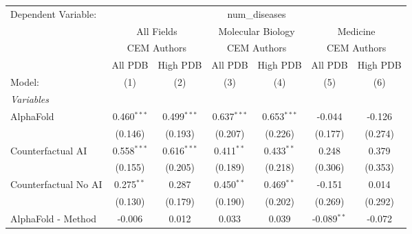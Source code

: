 \begingroup
\centering
\begin{tabular}{lcccccc}
   \tabularnewline \midrule \midrule
   Dependent Variable: & \multicolumn{6}{c}{num\_diseases}\\
 & \multicolumn{2}{c}{All Fields} & \multicolumn{2}{c}{Molecular Biology} & \multicolumn{2}{c}{Medicine} \\
\cmidrule(lr){2-3} \cmidrule(lr){4-5} \cmidrule(lr){6-7}
 & \multicolumn{2}{c}{CEM Authors} & \multicolumn{2}{c}{CEM Authors} & \multicolumn{2}{c}{CEM Authors} \\
\cmidrule(lr){2-3} \cmidrule(lr){4-5} \cmidrule(lr){6-7}
 & \multicolumn{1}{c}{All PDB} & \multicolumn{1}{c}{High PDB} & \multicolumn{1}{c}{All PDB} & \multicolumn{1}{c}{High PDB} & \multicolumn{1}{c}{All PDB} & \multicolumn{1}{c}{High PDB} \\
\cmidrule(lr){2-2} \cmidrule(lr){3-3} \cmidrule(lr){4-4} \cmidrule(lr){5-5} \cmidrule(lr){6-6} \cmidrule(lr){7-7}
   Model:                                                     & (1)            & (2)            & (3)           & (4)           & (5)           & (6)\\  
   \midrule
   \emph{Variables}\\
   AlphaFold                                                  & 0.460$^{***}$  & 0.499$^{***}$  & 0.637$^{***}$ & 0.653$^{***}$ & -0.044        & -0.126\\   
                                                              & (0.146)        & (0.193)        & (0.207)       & (0.226)       & (0.177)       & (0.274)\\   
   Counterfactual AI                                          & 0.558$^{***}$  & 0.616$^{***}$  & 0.411$^{**}$  & 0.433$^{**}$  & 0.248         & 0.379\\   
                                                              & (0.155)        & (0.205)        & (0.189)       & (0.218)       & (0.306)       & (0.353)\\   
   Counterfactual No AI                                       & 0.275$^{**}$   & 0.287          & 0.450$^{**}$  & 0.469$^{**}$  & -0.151        & 0.014\\   
                                                              & (0.130)        & (0.179)        & (0.190)       & (0.202)       & (0.269)       & (0.292)\\   
   AlphaFold - Method                                         & -0.006         & 0.012          & 0.033         & 0.039         & -0.089$^{**}$ & -0.072\\   

\end{tabular}
